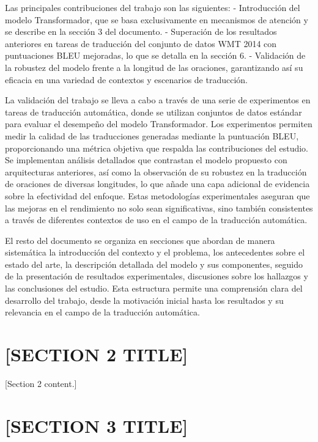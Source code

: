 \documentclass[journal]{IEEEtran}
\begin{document}
Las principales contribuciones del trabajo son las siguientes:
- Introducción del modelo Transformador, que se basa exclusivamente en mecanismos de atención y se describe en la sección 3 del documento.
- Superación de los resultados anteriores en tareas de traducción del conjunto de datos WMT 2014 con puntuaciones BLEU mejoradas, lo que se detalla en la sección 6.
- Validación de la robustez del modelo frente a la longitud de las oraciones, garantizando así su eficacia en una variedad de contextos y escenarios de traducción.

La validación del trabajo se lleva a cabo a través de una serie de experimentos en tareas de traducción automática, donde se utilizan conjuntos de datos estándar para evaluar el desempeño del modelo Transformador. Los experimentos permiten medir la calidad de las traducciones generadas mediante la puntuación BLEU, proporcionando una métrica objetiva que respalda las contribuciones del estudio. Se implementan análisis detallados que contrastan el modelo propuesto con arquitecturas anteriores, así como la observación de su robustez en la traducción de oraciones de diversas longitudes, lo que añade una capa adicional de evidencia sobre la efectividad del enfoque. Estas metodologías experimentales aseguran que las mejoras en el rendimiento no solo sean significativas, sino también consistentes a través de diferentes contextos de uso en el campo de la traducción automática.

El resto del documento se organiza en secciones que abordan de manera sistemática la introducción del contexto y el problema, los antecedentes sobre el estado del arte, la descripción detallada del modelo y sus componentes, seguido de la presentación de resultados experimentales, discusiones sobre los hallazgos y las conclusiones del estudio. Esta estructura permite una comprensión clara del desarrollo del trabajo, desde la motivación inicial hasta los resultados y su relevancia en el campo de la traducción automática.


\section{[SECTION 2 TITLE]}
\label{sec:section2}

[Section 2 content.]


\section{[SECTION 3 TITLE]}
\label{sec:section3}
\end{document}
